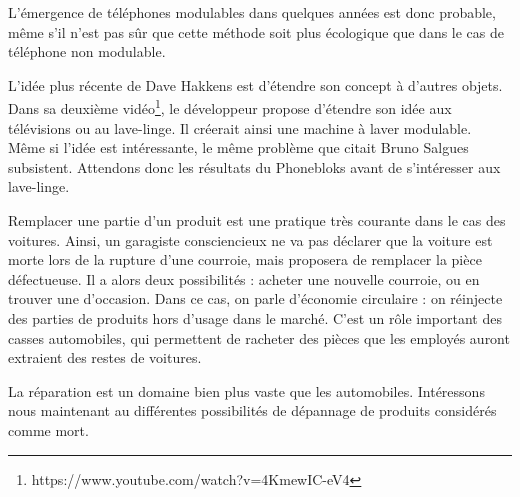 \medbreak 

L'émergence de téléphones modulables dans quelques années est donc probable, même s'il n'est pas sûr que cette méthode soit plus écologique que dans le cas de téléphone non modulable. 

L'idée plus récente de Dave Hakkens est d'étendre son concept à d'autres objets. Dans sa deuxième vidéo\footnote{https://www.youtube.com/watch?v=4KmewIC-eV4}, le développeur propose d'étendre son idée aux télévisions ou au lave-linge. Il créerait ainsi une machine à laver modulable. Même si l'idée est intéressante, le même problème que citait Bruno Salgues subsistent. Attendons donc les résultats du Phonebloks avant de s'intéresser aux lave-linge. 

\bigbreak

Remplacer une partie d'un produit est une pratique très courante dans le cas des voitures. 
Ainsi, un garagiste consciencieux ne va pas déclarer que la voiture est morte lors de la rupture d'une courroie, mais proposera de remplacer la pièce défectueuse. Il a alors deux possibilités : acheter une nouvelle courroie, ou en trouver une d'occasion. Dans ce cas, on parle d'économie circulaire : on réinjecte des parties de produits hors d'usage dans le marché. C'est un rôle important des casses automobiles, qui permettent de racheter des pièces que les employés auront extraient des restes de voitures. 

La réparation est un domaine bien plus vaste que les automobiles. Intéressons nous maintenant au différentes possibilités de dépannage de produits considérés comme mort. 